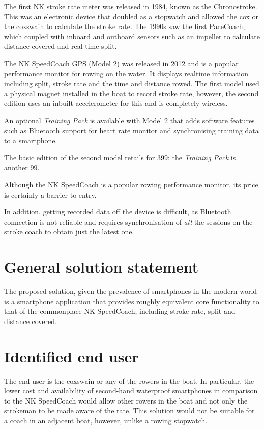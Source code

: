 \documentclass[11pt,twoside,a4paper]{report}
\begin{document}
The first NK stroke rate meter was released in 1984, known as the Chronostroke. This was an electronic device that doubled as a stopwatch and allowed the cox or the coxswain to calculate the stroke rate. The 1990s saw the first PaceCoach, which coupled with inboard and outboard sensors such as an impeller to calculate distance covered and real-time split.\cite{pacecoach}

The \href{https://nksports.com/speedcoach-gps-2}{NK SpeedCoach GPS (Model 2)} was released in 2012 and is a popular performance monitor for rowing on the water. 
It displays realtime information including split, stroke rate and the time and distance rowed. 
The first model used a physical magnet installed in the boat to record stroke rate, however, the second edition uses an inbuilt accelerometer for this and is completely wireless. 

An optional \textit{Training Pack} is available with Model 2 that adds software features such as Bluetooth support for heart rate monitor and synchronising training data to a smartphone.

The basic edition of the second model retails for \textsterling $399$; the \textit{Training Pack} is another \textsterling $99$.

Although the NK SpeedCoach is a popular rowing performance monitor, its price is certainly a barrier to entry. 

In addition, getting recorded data off the device is difficult, as Bluetooth connection is not reliable and requires synchronisation of \textit{all} the sessions on the stroke coach to obtain just the latest one.

\section{General solution statement}

The proposed solution, given the prevalence of smartphones in the modern world is a smartphone application that provides roughly equivalent core functionality to that of the commonplace NK SpeedCoach, including stroke rate, split and distance covered.

\section{Identified end user}

The end user is the coxswain or any of the rowers in the boat. In particular, the lower cost and availability of second-hand waterproof smartphones in comparison to the NK SpeedCoach would allow other rowers in the boat and not only the strokeman to be made aware of the rate. This solution would not be suitable for a coach in an adjacent boat, however, unlike a rowing stopwatch.
\end{document}
